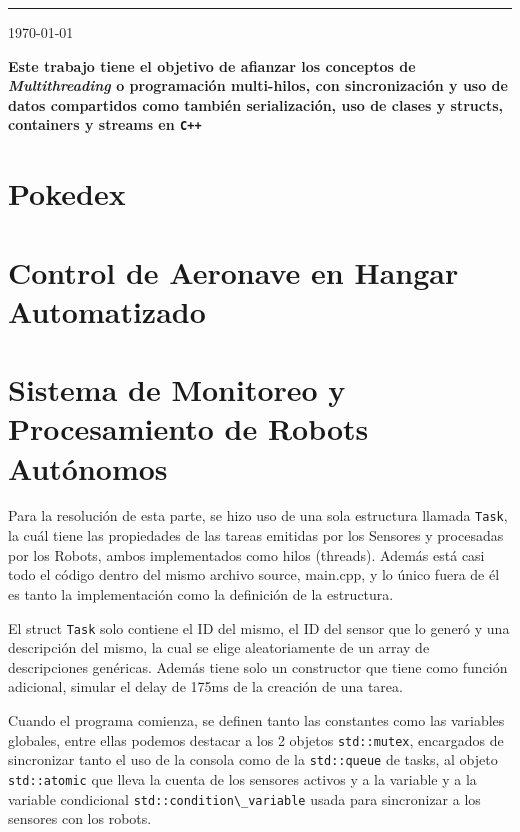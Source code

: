 \documentclass[11pt, a4paper]{article}
\begin{document}
{\noindent\rule{\textwidth}{0.5pt}}

\vspace{0.1cm}
\begin{center}
    {\large \today}
\end{center}
\vspace{0.1cm}

\begin{multicols}{2}

{\bfseries\selectfont Este trabajo tiene el objetivo de afianzar los conceptos de
\textit{Multithreading} o programación multi-hilos, con sincronización y uso de datos
compartidos como también serialización, uso de clases y structs, containers y streams
en \lstinline|C++|
}
\section{Pokedex}


\section{Control de Aeronave en Hangar Automatizado}


\section{Sistema de Monitoreo y Procesamiento de Robots Autónomos}
Para la resolución de esta parte, se hizo uso de una sola estructura
llamada \lstinline|Task|, la cuál tiene las propiedades de las tareas
emitidas por los Sensores y procesadas por los Robots, ambos
implementados como hilos (threads). Además está casi todo el código
dentro del mismo archivo source, main.cpp, y lo único fuera de él es tanto
la implementación como la definición de la estructura.

El struct \lstinline|Task| solo contiene el ID del mismo, el ID del
sensor que lo generó y una descripción del mismo, la cual se elige aleatoriamente
de un array de descripciones genéricas. Además tiene solo un constructor que tiene
como función adicional, simular el delay de 175ms de la creación de una tarea.

Cuando el programa comienza, se definen tanto las constantes como las variables
globales, entre ellas podemos destacar a los 2 objetos \lstinline|std::mutex|, encargados
de sincronizar tanto el uso de la consola como de la \lstinline|std::queue| de tasks,
al objeto \lstinline|std::atomic| que lleva la cuenta de los sensores activos y a la variable
y a la variable condicional \lstinline|std::condition\_variable| usada para sincronizar a
los sensores con los robots.


\end{multicols}
\end{document}
